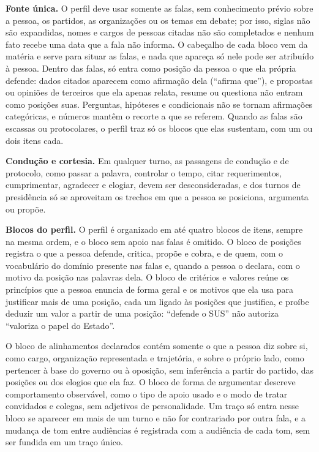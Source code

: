 \textbf{Fonte única.} O perfil deve usar somente as falas, sem conhecimento prévio sobre a pessoa,
os partidos, as organizações ou os temas em debate; por isso, siglas não são expandidas, nomes e
cargos de pessoas citadas não são completados e nenhum fato recebe uma data que a fala não informa.
O cabeçalho de cada bloco vem da matéria e serve para situar as falas, e nada que apareça só nele
pode ser atribuído à pessoa. Dentro das falas, só entra como posição da pessoa o que ela própria
defende: dados citados aparecem como afirmação dela (``afirma que''), e propostas ou opiniões de
terceiros que ela apenas relata, resume ou questiona não entram como posições suas. Perguntas,
hipóteses e condicionais não se tornam afirmações categóricas, e números mantêm o recorte a que se referem. Quando as falas são escassas ou
protocolares, o perfil traz só os blocos que elas sustentam, com um ou dois itens cada.

\textbf{Condução e cortesia.} Em qualquer turno, as passagens de condução e de protocolo, como passar
a palavra, controlar o tempo, citar requerimentos, cumprimentar, agradecer e elogiar, devem ser
desconsideradas, e dos turnos de presidência só se aproveitam os trechos em que a pessoa se
posiciona, argumenta ou propõe.

\textbf{Blocos do perfil.} O perfil é organizado em até quatro blocos de itens, sempre na mesma
ordem, e o bloco sem apoio nas falas é omitido. O bloco de posições registra o que a pessoa defende,
critica, propõe e cobra, e de quem, com o vocabulário do domínio presente nas falas e, quando a
pessoa o declara, com o motivo da posição nas palavras dela. O bloco de critérios e valores reúne os
princípios que a pessoa enuncia de forma geral e os motivos que ela usa para justificar mais de uma
posição, cada um ligado às posições que justifica, e proíbe deduzir um valor a partir de uma posição:
``defende o SUS'' não autoriza ``valoriza o papel do Estado''.

O bloco de alinhamentos declarados contém somente o que a pessoa diz sobre si, como cargo,
organização representada e trajetória, e sobre o próprio lado, como pertencer à base do governo ou à
oposição, sem inferência a partir do partido, das posições ou dos elogios que ela faz. O bloco de
forma de argumentar descreve comportamento observável, como o tipo de apoio usado e o modo de tratar
convidados e colegas, sem adjetivos de personalidade. Um traço só entra nesse bloco se aparecer em
mais de um turno e não for contrariado por outra fala, e a mudança de tom entre audiências é
registrada com a audiência de cada tom, sem ser fundida em um traço único.

